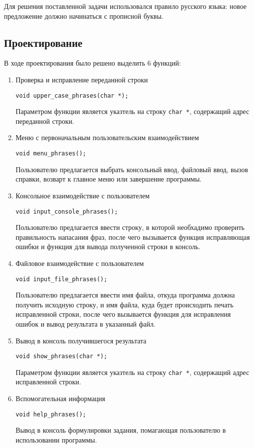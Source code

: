 \documentclass[12pt,a4paper]{report}
\begin{document}
Для решения поставленной задачи использовался правило русского языка: новое предложение должно начинаться с прописной буквы.

\subsection{Проектирование}
\hspace{\parindent}В ходе проектирования было решено выделить 6 функций:
\begin{enumerate}
 	\item Проверка и исправление переданной строки
 	
 	\verb+void upper_case_phrases(char *);+
 	
	Параметром функции является указтель на строку \verb+char *+, содержащий адрес переданной строки.	 
		 
		 
	\item Меню с первоначальным пользовательским взаимодействием
	
	\verb+void menu_phrases();+ 
	
	Пользователю предлагается выбрать консольный ввод, файловый ввод, вызов справки, возварт к главное меню или завершение программы. 	 
		 
	\item Консольное взаимодействие с пользователем
	
	\verb+void input_console_phrases();+

	Пользователю предлагается ввести строку, в которой необхадимо проверить правильность напасания фраз, после чего вызывается функция исправляющая ошибки и функция для вывода полученной строки в консоль.
	
	\item Файловое взаимодействие с пользователем
	
	\verb+void input_file_phrases();+

	Пользователю предлагается ввести имя файла, откуда программа должна получить исходную строку, и имя файла, куда будет происходить печать исправленной строки, после чего вызывается функция для исправления ошибок и вывод результата в указанный файл.
	
	\item Вывод в консоль получившегося результата
	
	\verb+void show_phrases(char *);+

Параметром функции является указтель на строку \verb+char *+, содержащий адрес исправленной строки.
	
	
	\item Вспомогательная информация
	
	\verb+void help_phrases();+
	
	Вывод в консоль формулировки задания, помагающая пользователю в использовании программы.
\end{enumerate}
\end{document}
